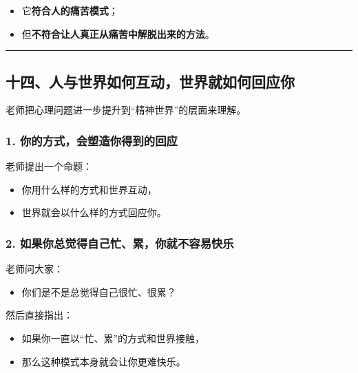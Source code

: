 \documentclass[
  chinese,
  9pt,
  a4paper,
]{ctexart}
\providecommand{\tightlist}{%
  \setlength{\itemsep}{0pt}\setlength{\parskip}{0pt}}
\begin{document}
\begin{itemize}
\tightlist
\item
  它\textbf{符合人的痛苦模式}；
\item
  但\textbf{不符合让人真正从痛苦中解脱出来的方法}。
\end{itemize}

\begin{center}\rule{0.5\linewidth}{0.5pt}\end{center}

\subsection{十四、人与世界如何互动，世界就如何回应你}\label{ux5341ux56dbux4ebaux4e0eux4e16ux754cux5982ux4f55ux4e92ux52a8ux4e16ux754cux5c31ux5982ux4f55ux56deux5e94ux4f60}

老师把心理问题进一步提升到``精神世界''的层面来理解。

\subsubsection{1.
你的方式，会塑造你得到的回应}\label{ux4f60ux7684ux65b9ux5f0fux4f1aux5851ux9020ux4f60ux5f97ux5230ux7684ux56deux5e94}

老师提出一个命题：

\begin{itemize}
\tightlist
\item
  你用什么样的方式和世界互动，
\item
  世界就会以什么样的方式回应你。
\end{itemize}

\subsubsection{2.
如果你总觉得自己忙、累，你就不容易快乐}\label{ux5982ux679cux4f60ux603bux89c9ux5f97ux81eaux5df1ux5fd9ux7d2fux4f60ux5c31ux4e0dux5bb9ux6613ux5febux4e50}

老师问大家：

\begin{itemize}
\tightlist
\item
  你们是不是总觉得自己很忙、很累？
\end{itemize}

然后直接指出：

\begin{itemize}
\tightlist
\item
  如果你一直以``忙、累''的方式和世界接触，
\item
  那么这种模式本身就会让你更难快乐。
\end{itemize}
\end{document}
